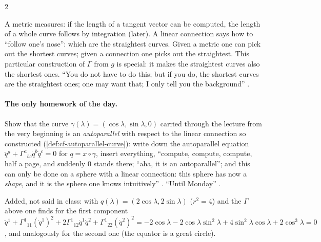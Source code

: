 \begin{paracol}{2}
\begin{intuition}
A metric measures: if the length of a tangent vector can be computed, the length of a whole curve follows by integration (later). A linear connection says how to ``follow one's nose'':
which are the straightest curves. Given a metric one can pick out the shortest curves; given a connection one picks out the straightest. This particular construction of $\Gamma$ from $g$ is special:
it makes the straightest curves also the shortest ones. ``You do not have to do this; but if you do, the shortest curves are the straightest ones; one may want that; I only tell you the background''
.
\end{intuition}

\paragraph{The only homework of the day.} Show that the curve $\gamma(\lambda)=(\cos\lambda,\sin\lambda,0)$ carried through the lecture from the very beginning is an \emph{autoparallel} with respect to
the linear connection so constructed (\cref{def:cf-autoparallel-curve}): write down the autoparallel equation $\ddot q^a+\Gamma^a{}_{bc}\dot q^b\dot q^c=0$ for $q=x\circ\gamma$, insert everything, ``compute, compute,
compute, half a page, and suddenly $0$ stands there; ``aha, it is an autoparallel''; and this can only be done on a sphere with a linear connection: this sphere has now a \emph{shape}, and it is the
sphere one knows intuitively'' . ``Until Monday'' .
\begin{coursenote}
Added, not said in class: with $q(\lambda)=(2\cos\lambda,2\sin\lambda)$ ($r^2=4$) and the $\Gamma$ above one finds for the first component
$\ddot q^1+\Gamma^1{}_{11}(\dot q^1)^2+2\Gamma^1{}_{12}\dot q^1\dot q^2+\Gamma^1{}_{22}(\dot q^2)^2
=-2\cos\lambda-2\cos\lambda\sin^2\lambda+4\sin^2\lambda\cos\lambda+2\cos^3\lambda=0$, and analogously for the second one (the equator is a great circle).
\end{coursenote}


\end{paracol}
